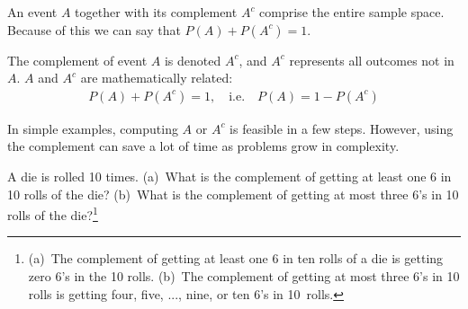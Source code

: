 An event $A$ together with its complement $A^c$ comprise the entire sample space. Because of this we can say that $P(A) + P(A^c) = 1$.

\begin{termBox}{
The complement of event $A$ is denoted $A^c$, and $A^c$ represents all outcomes not in~$A$. $A$ and $A^c$ are mathematically related: \vspace{-2mm}
\begin{eqnarray}\label{complement}
P(A) + P(A^c) = 1, \quad\text{i.e.}\quad P(A) = 1-P(A^c)
\end{eqnarray}\vspace{-6.5mm}}
\end{termBox}

In simple examples, computing $A$ or $A^c$ is feasible in a few steps. However, using the complement can save a lot of time as problems grow in complexity.

\begin{exercise}
A die is rolled 10 times. (a)~What is the complement of getting at least one 6 in 10 rolls of the die? (b)~What is the complement of getting at most three 6's in 10 rolls of the die?\footnote{(a)~The complement of getting at least one 6 in ten rolls of a die is getting zero 6's in the 10 rolls. (b)~The complement of getting at most three 6's in 10 rolls is getting four, five, ..., nine, or ten 6's in 10~rolls.}
\end{exercise}

%
%
%


